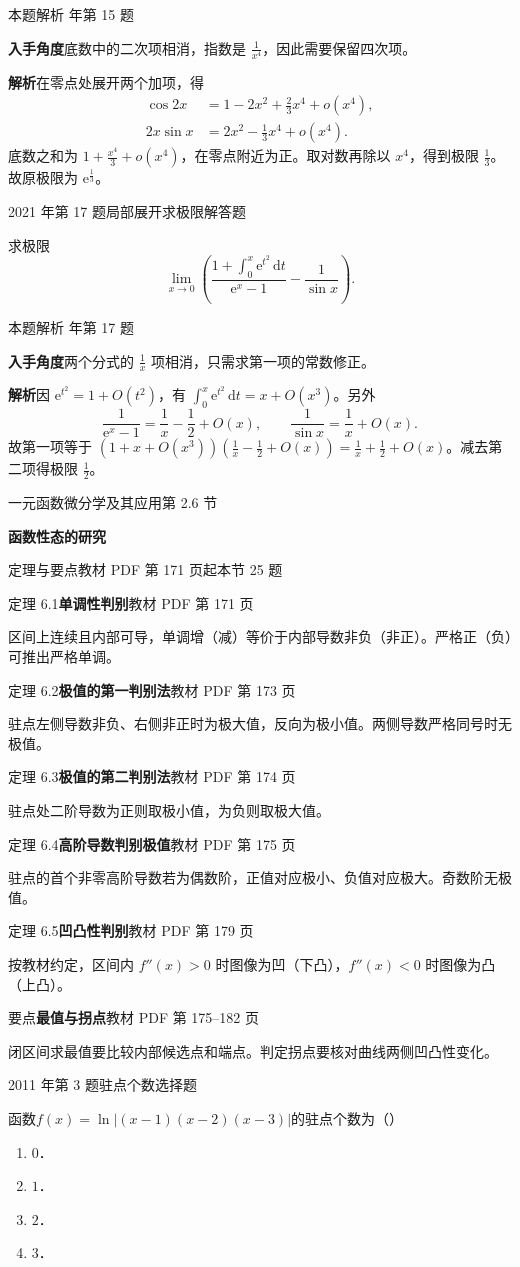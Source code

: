 \documentclass[UTF8,zihao=-4,fontset=fandol]{ctexart}
\renewcommand{\lim}{\operatorname*{lim}\limits}
\newcommand{\SectionHeading}[4]{%
  \clearpage\hypertarget{sec-#1}{}%
  {\small\textcolor{accent}{#2\hfill 第 #1 节}}\par\medskip
  {\LARGE\bfseries #3}\par\smallskip
  {\small\textcolor{muted}{#4}}\par\bigskip}
\newcommand{\Theory}[4]{%
  {\small\textcolor{accent}{#1}\quad\textbf{#3}\hfill\textcolor{muted}{教材 PDF 第 #2 页}}\par
  {\small #4}\par\smallskip}
\newcommand{\pickout}{\hfill（\hspace{1.4em}）}
\newenvironment{abcd}{\begin{enumerate}[label=\textup{(\Alph*)},leftmargin=2.3em,itemsep=1pt,topsep=4pt,parsep=1pt]}{\end{enumerate}}
\newcommand{\QuestionPage}[6]{%
  \par\noindent\begin{minipage}{\linewidth}
  \raggedright
  {\small\textcolor{black!60}{#3\quad #5}\hfill\textcolor{accent}{#2}}\par\smallskip}
\newcommand{\QuestionEnd}{\end{minipage}\par\medskip}
\newcommand{\QuestionPage}[6]{%
  \clearpage
  {\small\textcolor{accent}{#1\hfill #2}}\par\medskip
  {\small\textcolor{black!60}{#3\quad #5\hfill #6}}\par\vspace{9bp}}
\newcommand{\QuestionEnd}{}
\newenvironment{QuestionSolution}[1]{%
  \clearpage
  {\small\textcolor{black!60}{本题解析\quad #1}}\par\medskip
}{\par\clearpage}
\begin{document}
\begin{QuestionSolution}{2016 年第 15 题}
\textbf{入手角度}\quad 底数中的二次项相消，指数是 \(\frac{1}{x^4}\)，因此需要保留四次项。

\textbf{解析}\quad 在零点处展开两个加项，得
\[
\begin{aligned}
\cos2x&=1-2x^2+\tfrac23x^4+o(x^4),\\
2x\sin x&=2x^2-\tfrac13x^4+o(x^4).
\end{aligned}
\]
底数之和为 \(1+\frac{x^4}{3}+o(x^4)\)，在零点附近为正。取对数再除以 \(x^4\)，得到极限 \(\frac{1}{3}\)。故原极限为 \(\boxed{\mathrm{e}^{\frac{1}{3}}}\)。
\end{QuestionSolution}

\QuestionPage{2.5 Taylor定理及其应用}{解答题}{2021 年第 17 题}{2}{局部展开求极限}{104 / 234}
求极限
\[\lim_{x \to 0} \left(\frac{1+\int_{0}^{x} \mathrm{e}^{t^{2}} \,\mathrm{d} t}{\mathrm{e}^{x}-1}-\frac{1}{\sin x}\right).
\]
\QuestionEnd

\begin{QuestionSolution}{2021 年第 17 题}
\textbf{入手角度}\quad 两个分式的 \(\frac{1}{x}\) 项相消，只需求第一项的常数修正。

\textbf{解析}\quad 因 \(\mathrm{e}^{t^2}=1+O(t^2)\)，有 \(\int_0^x \mathrm{e}^{t^2}\,\mathrm{d}t=x+O(x^3)\)。另外
\[
\frac{1}{\mathrm{e}^x-1}=\frac1x-\frac12+O(x),
\qquad
\frac1{\sin x}=\frac1x+O(x).
\]
故第一项等于 \((1+x+O(x^3))(\frac{1}{x}-\frac{1}{2}+O(x))=\frac{1}{x}+\frac{1}{2}+O(x)\)。减去第二项得极限 \(\boxed{\frac{1}{2}}\)。
\end{QuestionSolution}

\SectionHeading{2.6}{一元函数微分学及其应用}{函数性态的研究}{定理与要点\quad 教材 PDF 第 171 页起\hfill 本节 25 题}
\Theory{定理 6.1}{171}{单调性判别}{区间上连续且内部可导，单调增（减）等价于内部导数非负（非正）。严格正（负）可推出严格单调。}
\Theory{定理 6.2}{173}{极值的第一判别法}{驻点左侧导数非负、右侧非正时为极大值，反向为极小值。两侧导数严格同号时无极值。}
\Theory{定理 6.3}{174}{极值的第二判别法}{驻点处二阶导数为正则取极小值，为负则取极大值。}
\Theory{定理 6.4}{175}{高阶导数判别极值}{驻点的首个非零高阶导数若为偶数阶，正值对应极小、负值对应极大。奇数阶无极值。}
\Theory{定理 6.5}{179}{凹凸性判别}{按教材约定，区间内 \(f''(x)>0\) 时图像为凹（下凸），\(f''(x)<0\) 时图像为凸（上凸）。}
\Theory{要点}{175--182}{最值与拐点}{闭区间求最值要比较内部候选点和端点。判定拐点要核对曲线两侧凹凸性变化。}
\QuestionPage{2.6 函数性态的研究}{选择题}{2011 年第 3 题}{1}{驻点个数}{105 / 234}
函数$f(x) = \ln \left| (x - 1)(x - 2)(x - 3) \right|$的驻点个数为\pickout{}
\begin{abcd}
\item $0$．
\item $1$．
\item $2$．
\item $3$．
\end{abcd}
\QuestionEnd
\end{document}
